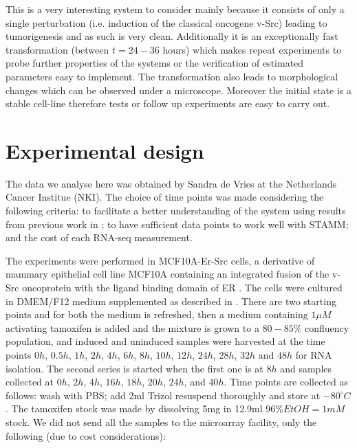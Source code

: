 This is a very interesting system to consider mainly because it consists of only a single perturbation (i.e. induction of the classical oncogene v-Src) leading to tumorigenesis and as such is very clean. Additionally it is an exceptionally fast transformation (between $t=24-36$ hours) which makes repeat experiments to probe further properties of the systems or the verification of estimated parameters easy to implement. The transformation also leads to morphological changes which can be observed under a microscope. Moreover the initial state is a stable cell-line therefore tests or follow up experiments are easy to carry out.

\section{Experimental design}
\label{sec:experimental-design}

The data we analyse here was obtained by Sandra de Vries at the Netherlands Cancer Institue (NKI). The choice of time points was made considering the following criteria: to facilitate a better understanding of the system using results from previous work in \cite{Hirsch:2010ec}; to have sufficient data points to work well with STAMM; and the cost of each RNA-seq measurement. 

The experiments were performed in MCF10A-Er-Src cells, a derivative of mammary epithelial cell line MCF10A containing an integrated fusion of the v-Src oncoprotein with the ligand binding domain of ER \citep{Hirsch:2010ec,Iliopoulos:2009do}. The cells were cultured in DMEM/F12 medium supplemented as described in \cite{Debnath:2003km}. There are two starting points and for both the medium is refreshed, then a medium containing $1 \mu M$ activating tamoxifen is added and the mixture is grown to a $80 - 85\%$ confluency population, and induced and uninduced samples were harvested at the time points $ 0h$, $ 0.5h$, $ 1h$, $ 2h$, $ 4h$, $ 6h$, $ 8h$, $ 10h$, $ 12h$, $ 24h$, $ 28h$, $ 32h \text{ and } 48h$ for RNA isolation. The second series is started when the first one is at $8h$ and samples collected at $0h$, $2h$, $4h$, $16h$, $18h$, $20h$, $24h$, and $40h$. Time points are collected as follows: wash with PBS; add 2ml Trizol resuspend thoroughly and store at $-80^{\circ}C$. The tamoxifen stock was made by dissolving 5mg in 12.9ml $96\% EtOH = 1mM$ stock. We did not send all the samples to the microarray facility, only the following (due to cost considerations): 

